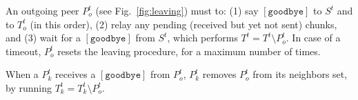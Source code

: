 \begin{figure*}
  \caption{Peer leaving.\label{fig:leaving}}
\end{figure*}
An outgoing peer $P^t_o$ (see Fig.~\ref{fig:leaving}) must to: (1) say
$[\mathtt{goodbye}]$ to $S^t$ and to $T^t_o$ (in this order), (2)
relay any pending (received but yet not sent) chunks, and (3) wait for
a $[\mathtt{goodbye}]$ from $S^t$, which performs $T^t = T^t \setminus
P^t_o$. In case of a timeout, $P^t_o$ resets the leaving procedure,
for a maximum number of times.

When a $P^t_k$ receives a $[\mathtt{goodbye}]$ from $P^t_o$, $P^t_k$
removes $P^t_o$ from its neighbors set, by running $T^t_k = T^t_k
\setminus P^t_o$.
